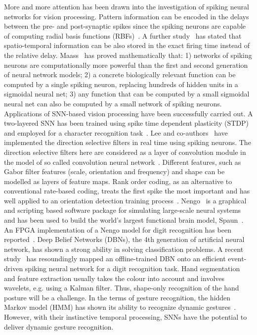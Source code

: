 \documentclass[journal]{journal}
\begin{document}
More and more attention has been drawn into the investigation of spiking neural networks for vision processing. 
Pattern information can be encoded in the delays between the pre- and post-synaptic spikes since the spiking neurons are capable of computing radial basis functions (RBFs)~\cite{hopfield1995pattern}.  
A further study~\cite{natschlager1998spatial} has stated that spatio-temporal information can be also stored in the exact firing time instead of the relative delay. Maass~\cite{maass1997networks} has proved mathematically that:
1) networks of spiking neurons are computationally more powerful than the first and second generation of neural network models;
2) a concrete biologically relevant function can be computed by a single spiking neuron, replacing  hundreds of hidden units in a sigmoidal neural net;
3) any function that can be computed by a small sigmoidal neural net can also be computed by a small network of spiking neurons.
Applications of SNN-based vision processing have been successfully carried out. 
A two-layered SNN has been trained using spike time dependent plasticity (STDP) and employed for a character recognition task~\cite{gupta2007character}. 
Lee and co-authors~\cite{6467270} have implemented the direction selective filters in real time using spiking neurons. 
The direction selective filters here are considered as a layer of convolution module in the model of so called convolution neural network~\cite{camunas2012event}. 
Different features, such as Gabor filter features (scale, orientation and frequency) and shape can be modelled as layers of feature maps. 
Rank order coding, as an alternative to conventional rate-based coding, treats the first spike the most important and has well applied to an orientation detection training process~\cite{delorme2001networks}. 
Nengo~\cite{eliasmith2011nengo} is a graphical and scripting based software package for simulating large-scale neural systems and has been used to build the world's largest functional brain model, Spaun~\cite{eliasmith2012large}. An FPGA implementation of a Nengo model for digit recognition has been reported~\cite{naylor2013managing}. 
Deep Belief Networks (DBNs), the 4th generation of artificial neural network, has shown a strong ability in solving classification problems. 
A recent study~\cite{o2013real} has resoundingly mapped an offline-trained DBN onto an efficient event-driven spiking neural network for a digit recognition task.
Hand segmentation and feature extraction usually takes the colour into account and involves wavelets, e.g. using a Kalman filter. 
Thus, shape-only recognition of the hand posture will be a challenge. 
In the terms of gesture recognition, the hidden Markov model (HMM) has shown its ability to recognize dynamic gestures~\cite{elmezain2009hidden}. 
However, with their instinctive temporal processing, SNNs have the potential to deliver dynamic gesture recognition.
\end{document}
